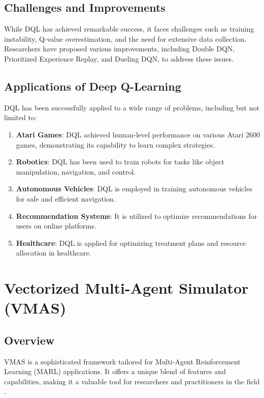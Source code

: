 \documentclass{scrartcl}
\begin{document}
\subsection{Challenges and Improvements}

While DQL has achieved remarkable success, it faces challenges such as training instability, Q-value overestimation, and the need for extensive data collection. Researchers have proposed various improvements, including Double DQN, Prioritized Experience Replay, and Dueling DQN, to address these issues.

\subsection{Applications of Deep Q-Learning}

DQL has been successfully applied to a wide range of problems, including but not limited to:

\begin{enumerate}
\item \textbf{Atari Games}: DQL achieved human-level performance on various Atari 2600 games, demonstrating its capability to learn complex strategies.
\item \textbf{Robotics}: DQL has been used to train robots for tasks like object manipulation, navigation, and control.
\item \textbf{Autonomous Vehicles}: DQL is employed in training autonomous vehicles for safe and efficient navigation.
\item \textbf{Recommendation Systems}: It is utilized to optimize recommendations for users on online platforms.
\item \textbf{Healthcare}: DQL is applied for optimizing treatment plans and resource allocation in healthcare.
\end{enumerate}

\newpage

\section{Vectorized Multi-Agent Simulator (VMAS)}

\subsection{Overview}

VMAS is a sophisticated framework tailored for Multi-Agent Reinforcement Learning (MARL) applications. It offers a unique blend of features and capabilities, making it a valuable tool for researchers and practitioners in the field \cite{bettini2022vmas}.
\end{document}
